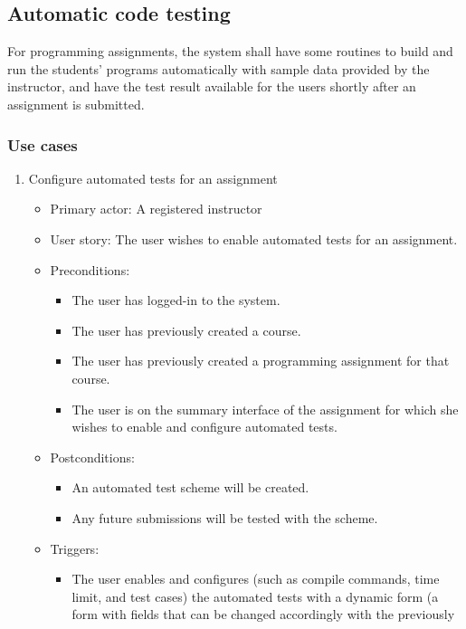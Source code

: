\subsection{Automatic code testing}
For programming assignments, the system shall have some routines to build and
run the students' programs automatically with sample data provided by the
instructor, and have the test result available for the users shortly after an
assignment is submitted.

\subsubsection{Use cases}
\begin{enumerate}
\item Configure automated tests for an assignment
\begin{itemize}
    \item Primary actor: A registered instructor
    \item User story: The user wishes to enable automated tests for an
        assignment.
    \item Preconditions:
        \begin{itemize}
            \item The user has logged-in to the system.
            \item The user has previously created a course.
            \item The user has previously created a programming assignment for
                that course.
            \item The user is on the summary interface of the assignment for
                which she wishes to enable and configure automated tests.
        \end{itemize}
    \item Postconditions:
        \begin{itemize}
            \item An automated test scheme will be created.
            \item Any future submissions will be tested with the scheme.
        \end{itemize}
    \item Triggers:
        \begin{itemize}
            \item The user enables and configures (such as compile commands, 
                time limit, and
                test cases) the automated tests with a dynamic form (a form
                with fields that can be changed accordingly with the previously

\end{itemize}
\end{itemize}
\end{enumerate}
